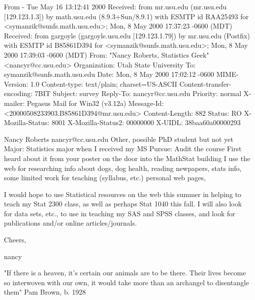 From - Tue May 16 13:12:41 2000
Received: from mr.usu.edu (mr.usu.edu [129.123.1.3])
	by math.usu.edu (8.9.3+Sun/8.9.1) with ESMTP id RAA25493
	for <symanzik@sunfs.math.usu.edu>; Mon, 8 May 2000 17:37:23 -0600 (MDT)
Received: from gargoyle (gargoyle.usu.edu [129.123.1.79])
	by mr.usu.edu (Postfix) with ESMTP id B85861D394
	for <symanzik@sunfs.math.usu.edu>; Mon,  8 May 2000 17:39:03 -0600 (MDT)
From: "Nancy Roberts, Statistics Geek" <nancyr@cc.usu.edu>
Organization: Utah State University
To: symanzik@sunfs.math.usu.edu
Date: Mon, 8 May 2000 17:02:12 -0600
MIME-Version: 1.0
Content-type: text/plain; charset=US-ASCII
Content-transfer-encoding: 7BIT
Subject: survey
Reply-To: nancyr@cc.usu.edu
Priority: normal
X-mailer: Pegasus Mail for Win32 (v3.12a)
Message-Id: <20000508233903.B85861D394@mr.usu.edu>
Content-Length: 882
Status: RO
X-Mozilla-Status: 8001
X-Mozilla-Status2: 00000000
X-UIDL: 38baa60a00000293

Nancy Roberts
nancyr@cc.usu.edu
Other, possible PhD student but not yet
Major: Statistics major when I received my MS
Pursue: Audit the course
First heard about it from your poster on the door into the MathStat 
building
I use the web for researching info about dogs, dog health, reading 
newpapers, stats info, some limited work for teaching (syllabus, 
etc.) personal web pages,

I would hope to use Statistical resources on the web this summer 
in helping to teach my Stat 2300 class, as well as perhaps Stat 
1040 this fall.  I will also look for data sets, etc., to use in teaching 
my SAS and SPSS classes, and look for publications and/or 
online articles/journals.

Cheers,

nancy




"If there is a heaven, it's certain our animals are to be there.
Their lives become so interwoven with our own,
it would take more than an archangel to disentangle them"
Pam Brown, b. 1928
